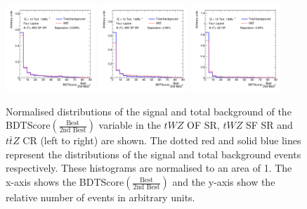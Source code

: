 \begin{figure}[h!]
    \centering
    \includegraphics[width=0.3\textwidth]{figures/bdtPlots/lep4_tWZ_4T_OF_BDT_Score_bestOver2ndBest_noExclusion.png}
    \includegraphics[width=0.3\textwidth]{figures/bdtPlots/lep4_tWZ_4T_SF_BDT_Score_bestOver2ndBest_noExclusion.png}
    \includegraphics[width=0.3\textwidth]{figures/bdtPlots/lep4_ttZ_4T_BDT_Score_bestOver2ndBest_noExclusion.png}
    \caption{Normalised distributions of the signal and total background of the BDTScore$(\frac{\text{Best}}{\text{2nd Best}})$ variable in the $tWZ$ OF SR, $tWZ$ SF SR and $t\bar{t}Z$ CR (left to right) are shown. The dotted red and solid blue lines represent the distributions of the signal and total background events respectively. These histograms are normalised to an area of 1. The x-axis shows the BDTScore$(\frac{\text{Best}}{\text{2nd Best}})$ and the y-axis show the relative number of events in arbitrary units.}
    \label{fig:bdtscore-bestover2ndbest}
\end{figure}

